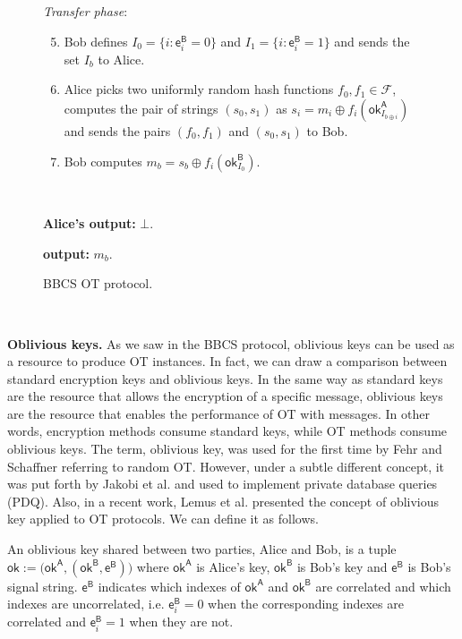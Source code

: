 \begin{figure}[h!]
\begin{tcolorbox}
            \textit{Transfer phase}:
            \begin{enumerate}
            \setcounter{enumi}{4}
                \item Bob defines $I_0 = \{ i : \mathsf{e}^{\mathsf{B}}_i = 0 \}$ and $I_1 = \{ i : \mathsf{e}^{\mathsf{B}}_i = 1 \}$ and sends the set $I_b$ to Alice.
                \item Alice picks two uniformly random hash functions $f_0, f_1 \in \mathcal{F}$, computes the pair of strings $(s_0, s_1)$ as $s_i = m_i \oplus f_i(\mathsf{ok}^{\mathsf{A}}_{I_{b\oplus i}})$ and sends the pairs $(f_0, f_1)$ and $(s_0, s_1)$ to Bob.
                \item Bob computes $m_b = s_b \oplus  f_i(\mathsf{ok}^{\mathsf{B}}_{I_0})$. 
            \end{enumerate}
            
            \
            
        \textbf{Alice's output:} $\bot$.
        
        \textbf{output:} $m_b$.
        
        \end{tcolorbox}
    \caption{BBCS OT protocol.}
    \label{fig:BBCS}
\end{figure}

\

\noindent\textbf{Oblivious keys.}  As we saw in the BBCS protocol, oblivious keys can be used as a resource to produce OT instances. In fact, we can draw a comparison between standard encryption keys and oblivious keys. In the same way as standard keys are the resource that allows the encryption of a specific message, oblivious keys are the resource that enables the performance of OT with messages. In other words, encryption methods consume standard keys, while OT methods consume oblivious keys. The term, oblivious key, was used for the first time by Fehr and Schaffner \cite{FS09} referring to random OT. However, under a subtle different concept, it was put forth by Jakobi et al. \cite{JSGBBWZ11} and used to implement private database queries (PDQ). Also, in a recent work, Lemus et al. \cite{Lemus20} presented the concept of oblivious key applied to OT protocols. We can define it as follows.

\begin{definition}
An oblivious key shared between two parties, Alice and Bob, is a tuple $\mathsf{ok}:= \big( \mathsf{ok}^{\mathsf{A}}, (\mathsf{ok}^{\mathsf{B}}, \mathsf{e}^{\mathsf{B}}) \big)$ where $\mathsf{ok}^{\mathsf{A}}$ is Alice's key, $\mathsf{ok}^{\mathsf{B}}$ is Bob's key and $\mathsf{e}^{\mathsf{B}}$ is Bob's signal string. $\mathsf{e}^{\mathsf{B}}$ indicates which indexes of $\mathsf{ok}^{\mathsf{A}}$ and $\mathsf{ok}^{\mathsf{B}}$ are correlated and which indexes are uncorrelated, i.e. $\mathsf{e}^{\mathsf{B}}_i = 0$ when the corresponding indexes are correlated and $\mathsf{e}^{\mathsf{B}}_i = 1$ when they are not.
\label{def:ok}
\end{definition}

